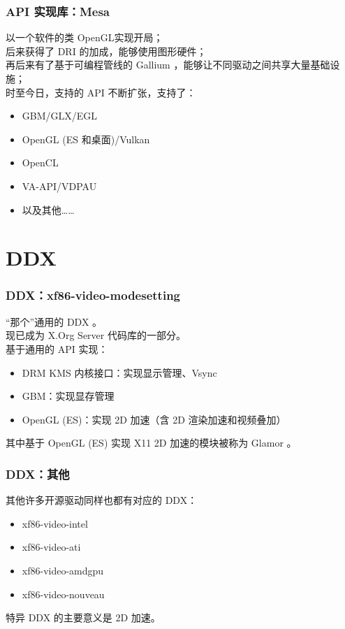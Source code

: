 \documentclass{ctexbeamer}
\begin{document}
\begin{frame}
    \frametitle{API 实现库：Mesa}
    以一个软件的类 OpenGL\textregistered 实现开局；\\
    后来获得了 DRI 的加成，能够使用图形硬件；\\
    再后来有了基于可编程管线的 Gallium ，能够让不同驱动之间共享大量基础设施；\\
    时至今日，支持的 API 不断扩张，支持了：\\
    \begin{itemize}
        \item GBM/GLX/EGL
        \item OpenGL (ES 和桌面)/Vulkan
        \item OpenCL
        \item VA-API/VDPAU
        \item 以及其他……
    \end{itemize}
\end{frame}

\section{DDX}

\begin{frame}
    \frametitle{DDX：xf86-video-modesetting}
    “那个”通用的 DDX 。\\
    现已成为 X.Org Server 代码库的一部分。\\
    基于通用的 API 实现：\\
    \begin{itemize}
        \item DRM KMS 内核接口：实现显示管理、Vsync
        \item GBM：实现显存管理
        \item OpenGL (ES)：实现 2D 加速（含 2D 渲染加速和视频叠加）
    \end{itemize}
    其中基于 OpenGL (ES) 实现 X11 2D 加速的模块被称为 Glamor 。
\end{frame}

\begin{frame}
    \frametitle{DDX：其他}
    其他许多开源驱动同样也都有对应的 DDX：
    \begin{itemize}
        \item xf86-video-intel
        \item xf86-video-ati
        \item xf86-video-amdgpu
        \item xf86-video-nouveau
    \end{itemize}
    特异 DDX 的主要意义是 2D 加速。
\end{frame}
\end{document}
